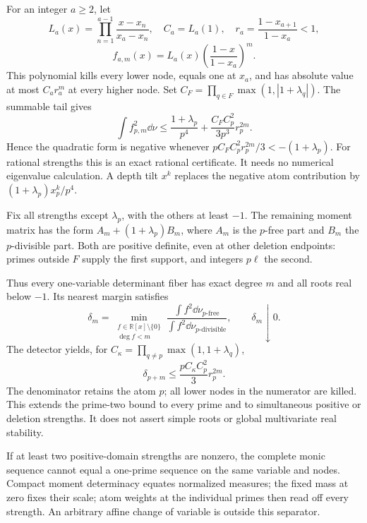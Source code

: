 For an integer $a\ge2$, let
\[
L_a(x)=\prod_{n=1}^{a-1}\frac{x-x_n}{x_a-x_n},\quad
C_a=L_a(1),\quad r_a=\frac{1-x_{a+1}}{1-x_a}<1,
\]
\[
f_{a,m}(x)=L_a(x)\left(\frac{1-x}{1-x_a}\right)^m.
\]
This polynomial kills every lower node, equals one at $x_a$, and has
absolute value at most $C_ar_a^m$ at every higher node.
Set $C_F=\prod_{q\in F}\max(1,|1+\lambda_q|)$. The summable tail gives
\[
\int f_{p,m}^2\dd\nu
\le\frac{1+\lambda_p}{p^4}+
\frac{C_FC_p^2}{3p^3}r_p^{2m}.
\]
Hence the quadratic form is negative whenever
$pC_FC_p^2r_p^{2m}/3<-(1+\lambda_p)$.
For rational strengths this is an exact rational certificate. It needs no
numerical eigenvalue calculation. A depth tilt $x^k$ replaces the negative
atom contribution by $(1+\lambda_p)x_p^k/p^4$.

Fix all strengths except $\lambda_p$, with the others at least $-1$.
The remaining moment matrix has the form $A_m+(1+\lambda_p)B_m$, where
$A_m$ is the $p$-free part and $B_m$ the $p$-divisible part. Both are
positive definite, even at other deletion endpoints: primes outside $F$
supply the first support, and integers $p\ell$ the second.

Thus every one-variable determinant fiber has exact degree $m$ and all
roots real below $-1$. Its nearest margin satisfies
\[
\delta_m=\min_{\substack{f\in\mathbb R[x]\setminus\{0\}\\\deg f<m}}
\frac{\int f^2\dd\nu_{p\text{-free}}}
{\int f^2\dd\nu_{p\text{-divisible}}},\qquad\delta_m\downarrow0.
\]
The detector yields, for $C_\kappa=\prod_{q\ne p}\max(1,1+\lambda_q)$,
\[
\delta_{p+m}\le\frac{pC_\kappa C_p^2}{3}r_p^{2m}.
\]
The denominator retains the atom $p$; all lower nodes in the numerator are
killed. This extends the prime-two bound to every prime and to simultaneous
positive or deletion strengths. It does not assert simple roots or global
multivariate real stability.

If at least two positive-domain strengths are nonzero, the complete monic
sequence cannot equal a one-prime sequence on the same variable and nodes.
Compact moment determinacy equates normalized measures; the fixed mass at
zero fixes their scale; atom weights at the individual primes then read off
every strength. An arbitrary affine change of variable is outside this separator.
